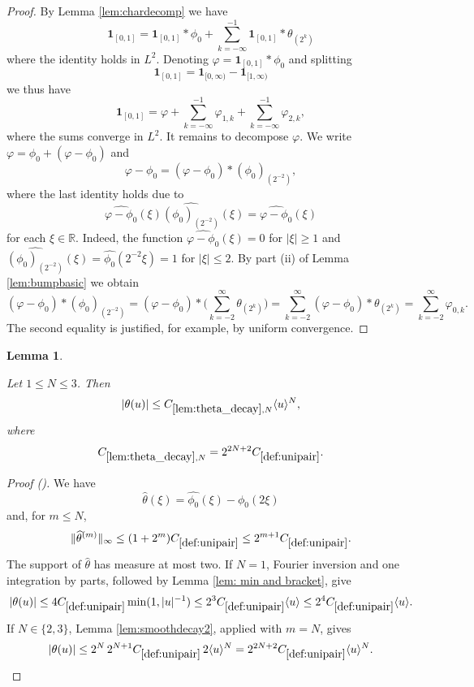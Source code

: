 \documentclass[12pt,reqno]{amsart}
\newcommand{\auto}{{({\tiny\faCar})}}
\theoremstyle{plain}
\newtheorem{lemma}[theorem]{Lemma}
\numberwithin{equation}{section}
\theoremstyle{remark}
\newcommand{\uses}[1]{}
\newcommand{\usesdefs}[1]{}
\newcommand{\leanok}{}
\newcommand{\lean}[1]{}
\newcommand{\R}{{\mathbb R}}
\begin{document}
\begin{proof}
By Lemma \ref{lem:chardecomp} we have
\begin{equation}
    \label{eq:L2char}
    \mathbf{1}_{[0,1]} =\mathbf{1}_{[0,1]}\ast\phi_0  +  \sum_{k=-\infty}^{-1} \mathbf{1}_{[0,1]}\ast  \theta_{(2^k)}
\end{equation}
where the identity holds in $L^2$.
Denoting $\varphi=\mathbf{1}_{[0,1]}\ast\phi_0$ and splitting
\[\mathbf{1}_{[0,1]} = \mathbf{1}_{[0,\infty)} - \mathbf{1}_{[1,\infty)}\]
 we  thus have
\[\mathbf{1}_{[0,1]} = \varphi +  \sum_{k=-\infty}^{-1} \varphi_{1,k}+ \sum_{k=-\infty}^{-1}\varphi_{2,k},\]
where the sums converge in $L^2$.
It remains to decompose $\varphi$.
We  write $\varphi= \phi_0 + (\varphi-\phi_0)$
and
\[
\varphi-\phi_0 = (\varphi - \phi_0)*(\phi_0)_{(2^{-2})},\]
where the last identity holds due to
\[\widehat{\varphi-\phi_0}(\xi) \widehat{(\phi_0)_{(2^{-2})}}(\xi) = \widehat{\varphi-\phi_0}(\xi) \]
for each $\xi\in \R$. Indeed, the function $\widehat{\varphi-\phi_0}(\xi)=0$ for $|\xi|\ge 1$ and $\widehat{(\phi_0)_{(2^{-2})}}(\xi) = \widehat{\phi_0}(2^{-2}\xi) =1$ for $|\xi|\le 2$.
By part (ii) of Lemma \ref{lem:bumpbasic} we obtain
\[ (\varphi - \phi_0)*(\phi_0)_{(2^{-2})} =  (\varphi - \phi_0)*\Big( \sum_{k=-2}^\infty \theta_{(2^k)}\Big )  =  \sum_{k=-2}^\infty (\varphi - \phi_0)*\theta_{(2^k)} =   \sum_{k=-2}^\infty \varphi_{0,k}.
\]
The  second equality is justified, for example, by uniform convergence.
\end{proof}

\begin{lemma}\label{lem:theta_decay}\uses{lem:smoothdecay2,lem: min and bracket}\usesdefs{bracket bump,def:cn-window,def:unipair,defn:window based bump functions}
\lean{Auto.thetaDecay}
\leanok
Let $1\le N\le3$. Then
\begin{equation}\label{auto:theta-decay}
|\theta(u)|\le C_{\ref{lem:theta_decay},N}\langle u\rangle^N,
\end{equation}
where
\begin{equation}\label{auto:theta-decay-constant-definition}
C_{\ref{lem:theta_decay},N}=2^{2N+2}C_{\ref{def:unipair}}.
\end{equation}
\end{lemma}
\begin{proof}[Proof \auto]
We have
\[
\widehat\theta(\xi)=\widehat{\phi_0}(\xi)-\widehat{\phi_0}(2\xi)
\]
and, for $m\le N$,
\[
\|\widehat\theta^{(m)}\|_\infty
\le(1+2^m)C_{\ref{def:unipair}}\le2^{m+1}C_{\ref{def:unipair}}.
\]
The support of $\widehat\theta$ has measure at most two. If $N=1$, Fourier inversion and one integration by parts, followed by Lemma \ref{lem: min and bracket}, give
\[
|\theta(u)|
\le4C_{\ref{def:unipair}}\min(1,|u|^{-1})
\le2^3C_{\ref{def:unipair}}\langle u\rangle
\le2^4C_{\ref{def:unipair}}\langle u\rangle.
\]
If $N\in\{2,3\}$, Lemma \ref{lem:smoothdecay2}, applied with $m=N$, gives
\[
|\theta(u)|
\le2^N\,2^{N+1}C_{\ref{def:unipair}}\,2\langle u\rangle^N
=2^{2N+2}C_{\ref{def:unipair}}\langle u\rangle^N.
\]
\end{proof}
\end{document}
